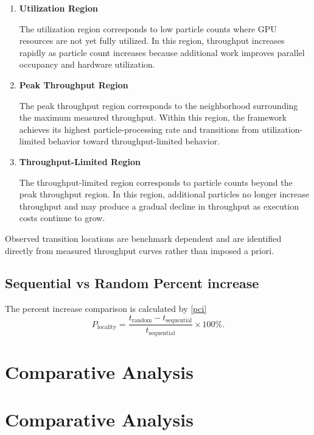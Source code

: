 \begin{enumerate}

\item \textbf{Utilization Region}

The utilization region corresponds to low particle counts where GPU
resources are not yet fully utilized. In this region, throughput
increases rapidly as particle count increases because additional work
improves parallel occupancy and hardware utilization.

\item \textbf{Peak Throughput Region}

The peak throughput region corresponds to the neighborhood surrounding
the maximum measured throughput. Within this region, the framework
achieves its highest particle-processing rate and transitions from
utilization-limited behavior toward throughput-limited behavior.

\item \textbf{Throughput-Limited Region}

The throughput-limited region corresponds to particle counts beyond the
peak throughput region. In this region, additional particles no longer
increase throughput and may produce a gradual decline in throughput as
execution costs continue to grow.

\end{enumerate}

Observed transition locations are benchmark dependent and are
identified directly from measured throughput curves rather than imposed
a priori.

\subsection{Sequential vs Random Percent increase}

The percent increase comparison is calculated by \ref{pci}
\begin{equation}
\label{pci}
P_{\mathrm{locality}}
=
\frac{t_{\mathrm{random}}-t_{\mathrm{sequential}}}
     {t_{\mathrm{sequential}}}
\times 100\%.
\end{equation}

\newpage
\section{Comparative Analysis}

\section{Comparative Analysis}

